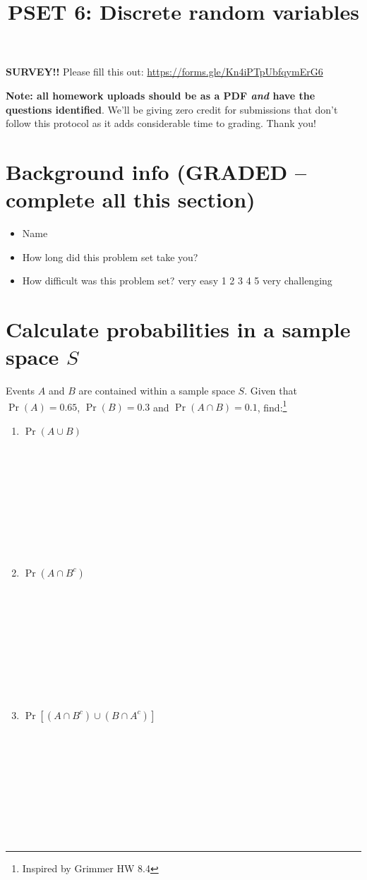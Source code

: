 \documentclass[
]{article}
\title{PSET 6: Discrete random variables}
\author{}
\date{\vspace{-2.5em}}
\begin{document}
\maketitle

\textbf{SURVEY!!} Please fill this out:
\url{https://forms.gle/Kn4iPTpUbfqymErG6}

\textbf{Note: all homework uploads should be as a PDF \emph{and} have
the questions identified}. We'll be giving zero credit for submissions
that don't follow this protocol as it adds considerable time to grading.
Thank you!

\section{Background info (GRADED -- complete all this
section)}\label{background-info-graded-complete-all-this-section}

\begin{itemize}
\item
  Name
\item
  How long did this problem set take you?
\item
  How difficult was this problem set? very easy 1 2 3 4 5 very
  challenging
\end{itemize}

\section{\texorpdfstring{Calculate probabilities in a sample space
\(S\)}{Calculate probabilities in a sample space S}}\label{calculate-probabilities-in-a-sample-space-s}

Events \(A\) and \(B\) are contained within a sample space \(S\). Given
that \(\Pr(A)=0.65\), \(\Pr(B)=0.3\) and \(\Pr(A \cap B) = 0.1\),
find:\footnote{Inspired by Grimmer HW 8.4}

\begin{enumerate}
\def\labelenumi{\alph{enumi}.}
\item
  \(\Pr(A \cup B)\)

  \strut \\
  \strut ~\\
  \strut ~\\
  \strut ~\\
  \strut \\
\item
  \(\Pr(A \cap B^c)\)

  \strut \\
  \strut ~\\
  \strut ~\\
  \strut ~\\
  \strut \\
\item
  \(\Pr[(A \cap B^c) \cup (B \cap A^c)]\)

  \strut \\
  \strut ~\\
  \strut ~\\
  \strut ~\\
  \strut \\
\end{enumerate}
\end{document}
